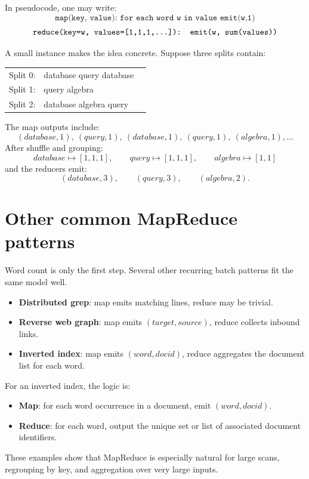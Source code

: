 \documentclass[11pt,a4paper,openany]{book}
\begin{document}
In pseudocode, one may write:
\[
\texttt{map(key, value): for each word w in value emit(w,1)}
\]
\[
\texttt{reduce(key=w, values=[1,1,1,\dots]): emit(w, sum(values))}
\]

A small instance makes the idea concrete. Suppose three splits contain:

\begin{center}
\begin{tabular}{lll}
Split 0: & database query database & \\
Split 1: & query algebra & \\
Split 2: & database algebra query &
\end{tabular}
\end{center}

The map outputs include:
\[
(database,1),\ (query,1),\ (database,1),\ (query,1),\ (algebra,1),\dots
\]
After shuffle and grouping:
\[
database \mapsto [1,1,1],\qquad
query \mapsto [1,1,1],\qquad
algebra \mapsto [1,1]
\]
and the reducers emit:
\[
(database,3),\qquad (query,3),\qquad (algebra,2).
\]

\section{Other common MapReduce patterns}
Word count is only the first step. Several other recurring batch patterns fit the same model well.

\begin{itemize}
\item \textbf{Distributed grep}: map emits matching lines, reduce may be trivial.
\item \textbf{Reverse web graph}: map emits \((target,source)\), reduce collects inbound links.
\item \textbf{Inverted index}: map emits \((word,docid)\), reduce aggregates the document list for each word.
\end{itemize}

For an inverted index, the logic is:
\begin{itemize}
\item \textbf{Map}: for each word occurrence in a document, emit \((word, docid)\).
\item \textbf{Reduce}: for each word, output the unique set or list of associated document identifiers.
\end{itemize}

These examples show that MapReduce is especially natural for large scans, regrouping by key, and aggregation over very large inputs.
\end{document}
